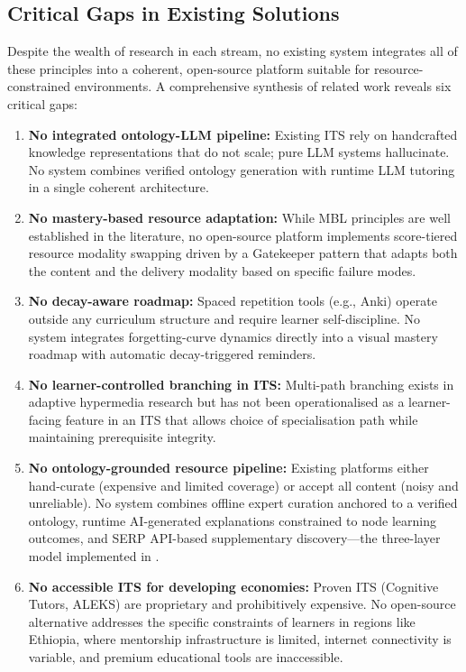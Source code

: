 \subsection{Critical Gaps in Existing Solutions}

Despite the wealth of research in each stream, no existing system integrates all of these principles into a coherent, open-source platform suitable for resource-constrained environments. A comprehensive synthesis of related work reveals six critical gaps:

\begin{enumerate}
    \item \textbf{No integrated ontology-LLM pipeline:} Existing ITS rely on handcrafted knowledge representations that do not scale; pure LLM systems hallucinate. No system combines verified ontology generation with runtime LLM tutoring in a single coherent architecture.
    \item \textbf{No mastery-based resource adaptation:} While MBL principles are well established in the literature, no open-source platform implements score-tiered resource modality swapping driven by a Gatekeeper pattern that adapts both the content and the delivery modality based on specific failure modes.
    \item \textbf{No decay-aware roadmap:} Spaced repetition tools (e.g., Anki) operate outside any curriculum structure and require learner self-discipline. No system integrates forgetting-curve dynamics directly into a visual mastery roadmap with automatic decay-triggered reminders.
    \item \textbf{No learner-controlled branching in ITS:} Multi-path branching exists in adaptive hypermedia research but has not been operationalised as a learner-facing feature in an ITS that allows choice of specialisation path while maintaining prerequisite integrity.
    \item \textbf{No ontology-grounded resource pipeline:} Existing platforms either hand-curate (expensive and limited coverage) or accept all content (noisy and unreliable). No system combines offline expert curation anchored to a verified ontology, runtime AI-generated explanations constrained to node learning outcomes, and SERP API-based supplementary discovery---the three-layer model implemented in \projectname.
    \item \textbf{No accessible ITS for developing economies:} Proven ITS (Cognitive Tutors, ALEKS) are proprietary and prohibitively expensive. No open-source alternative addresses the specific constraints of learners in regions like Ethiopia, where mentorship infrastructure is limited, internet connectivity is variable, and premium educational tools are inaccessible.
\end{enumerate}

